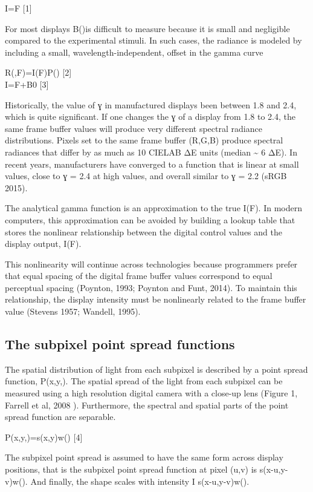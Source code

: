 \documentclass[
  letterpaper,
]{book}
\begin{document}
I=F {[}1{]}

For most displays B()is difficult to measure because it is small and
negligible compared to the experimental stimuli. In such cases, the
radiance is modeled by including a small, wavelength-independent, offset
in the gamma curve

R(,F)=I(F)P() {[}2{]}\\
I=F+B0 {[}3{]}

Historically, the value of ɣ in manufactured displays been between 1.8
and 2.4, which is quite significant. If one changes the ɣ of a display
from 1.8 to 2.4, the same frame buffer values will produce very
different spectral radiance distributions. Pixels set to the same frame
buffer (R,G,B) produce spectral radiances that differ by as much as 10
CIELAB ΔE units (median \textasciitilde{} 6 ΔE). In recent years,
manufacturers have converged to a function that is linear at small
values, close to ɣ = 2.4 at high values, and overall similar to ɣ = 2.2
(sRGB 2015).

The analytical gamma function is an approximation to the true I(F). In
modern computers, this approximation can be avoided by building a lookup
table that stores the nonlinear relationship between the digital control
values and the display output, I(F).

This nonlinearity will continue across technologies because programmers
prefer that equal spacing of the digital frame buffer values correspond
to equal perceptual spacing (Poynton, 1993; Poynton and Funt, 2014). To
maintain this relationship, the display intensity must be nonlinearly
related to the frame buffer value (Stevens 1957; Wandell, 1995).

\subsection{The subpixel point spread
functions}\label{the-subpixel-point-spread-functions}

The spatial distribution of light from each subpixel is described by a
point spread function, P(x,y,). The spatial spread of the light from
each subpixel can be measured using a high resolution digital camera
with a close-up lens (Figure 1, Farrell et al, 2008 ). Furthermore, the
spectral and spatial parts of the point spread function are separable.

P(x,y,)=s(x,y)w() {[}4{]}

The subpixel point spread is assumed to have the same form across
display positions, that is the subpixel point spread function at pixel
(u,v) is s(x-u,y-v)w(). And finally, the shape scales with intensity I
s(x-u,y-v)w().
\end{document}
